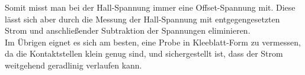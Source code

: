 Somit misst man bei der Hall-Spannung immer eine Offset-Spannung mit. Diese lässt sich aber durch die Messung der Hall-Spannung mit entgegengesetzten Strom und anschließender Subtraktion der Spannungen eliminieren.\\
Im Übrigen eignet es sich am besten, eine Probe in Kleeblatt-Form zu vermessen, da die Kontaktstellen klein genug sind, und sichergestellt ist, dass der Strom weitgehend geradlinig verlaufen kann.